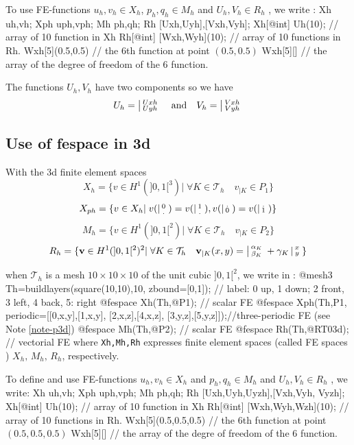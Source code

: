 \documentclass[a4paper,twoside,12pt]{book}
\begin{document}
To use FE-functions
$ u_{h},v_{h} \in X_{h} $,  $ p_{h},q_{h} \in M_{h} $
and $U_{h},V_{h} \in R_{h}$
, we write :
\bFF
  Xh uh,vh;
  Xph uph,vph;
  Mh ph,qh;
  Rh [Uxh,Uyh],[Vxh,Vyh];
  Xh[@int] Uh(10); //  array of 10 function in Xh
  Rh[@int] [Wxh,Wyh](10); //  array of 10 functions in Rh.
  Wxh[5](0.5,0.5)  // the 6th  function at point $(0.5,0.5)$
  Wxh[5][] // the array of the degree of freedom of the 6 function.
\eFF

The functions $U_{h},V_{h}$ have two components so we have
$$U_{h}=\left|\begin{smallmatrix} Uxh \\ Uyh \end{smallmatrix}\right.  \quad \mbox{and}\quad V_{h}=\left|\begin{smallmatrix} Vxh \\ Vyh \end{smallmatrix}\right.$$

\subsection{Use of fespace in 3d}
With the 3d finite element spaces
$$  X_{h} = \{ v \in H^{1}(]0,1[^3) |\; \forall K \in \mathcal{T}_{h}
\quad v_{|K} \in
P_{1} \}$$
$$ X_{ph} = \{  v \in X_{h} |\; v(\left|\begin{smallmatrix} 0 \\ . \end{smallmatrix}\right. ) =  v(\left|\begin{smallmatrix} 1 \\ . \end{smallmatrix}\right.) , v(\left|\begin{smallmatrix} . \\ 0 \end{smallmatrix}\right. ) =  v(\left|\begin{smallmatrix} . \\ 1 \end{smallmatrix}\right. )  \}$$
$$  M_{h} = \{ v \in H^{1}(]0,1[^2) |\; \forall K \in \mathcal{T}_{h}
\quad v_{|K} \in
P_{2} \}$$
$$  R_{h} = \{ \mathbf{v} \in H^{1}(]0,1[^2)^{2} |\; \forall K \in \mathcal{T}_{h}
\quad
 \mathbf{v}_{|K}(x,y) =
         \left|\begin{smallmatrix} \alpha_{K} \\ \beta_{K} \end{smallmatrix}\right. + \gamma_{K}\left|\begin{smallmatrix} x \\ y \end{smallmatrix}\right. \}$$

when $\mathcal{T}_h$ is a mesh $10\times 10\times 10$ of the unit cubic  $]0,1[^2$,
we write in \freefempp :
\bFF
@mesh3 Th=buildlayers(square(10,10),10, zbound=[0,1]);
// label:  0 up, 1 down; 2 front, 3 left, 4 back, 5: right
@fespace Xh(Th,@P1);      //  scalar FE
@fespace Xph(Th,P1,
         periodic=[[0,x,y],[1,x,y],
                   [2,x,z],[4,x,z],
                   [3,y,z],[5,y,z]]);//three-periodic FE (see Note \ref{note-p3d})
@fespace Mh(Th,@P2);      //  scalar FE
@fespace Rh(Th,@RT03d);     //  vectorial FE
\eFF
where \texttt{Xh,Mh,Rh} expresses finite element spaces (called FE spaces
) $X_h,\, M_h,\, R_h$, respectively.

To define and use FE-functions
$ u_{h},v_{h} \in X_{h} $ and $ p_{h},q_{h} \in M_{h} $
and $U_{h},V_{h} \in R_{h}$
, we write:
\bFF
  Xh uh,vh;
  Xph uph,vph;
  Mh ph,qh;
  Rh [Uxh,Uyh,Uyzh],[Vxh,Vyh, Vyzh];
  Xh[@int] Uh(10); //  array of 10 function in Xh
  Rh[@int] [Wxh,Wyh,Wzh](10); //  array of 10 functions in Rh.
  Wxh[5](0.5,0.5,0.5)  // the 6th  function at point $(0.5,0.5,0.5)$
  Wxh[5][]                                    // the array of the degre of freedom of the 6 function.
\eFF
\end{document}
